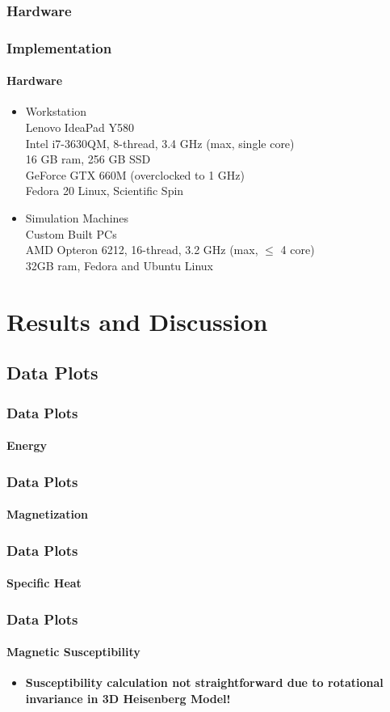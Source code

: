 \documentclass{beamer}
\begin{document}
  \subsubsection*{Hardware}
  \begin{frame}
    \frametitle{Implementation}
    \framesubtitle{Hardware}
    \begin{itemize}
    	\item Workstation\\
    				Lenovo IdeaPad Y580 \\
    				Intel i7-3630QM,  8-thread, 3.4 GHz (max, single core) \\
    				16 GB ram, 256 GB SSD \\
    				GeForce GTX 660M (overclocked to 1 GHz) \\
    				Fedora 20 Linux, Scientific Spin
    	\item Simulation Machines\\
    				Custom Built PCs \\
    				AMD Opteron 6212, 16-thread, 3.2 GHz (max, $\le$ 4 core) \\
    				32GB ram, Fedora and Ubuntu Linux
    \end{itemize}
  \end{frame}
    
  \section{Results and Discussion}
  \subsection{Data Plots}
  \begin{frame}
    \frametitle{Data Plots}
    \framesubtitle{Energy}
  \end{frame}
  \begin{frame}
  	\frametitle{Data Plots}
    \framesubtitle{Magnetization}
  \end{frame}
  \begin{frame}
  	\frametitle{Data Plots}
    \framesubtitle{Specific Heat}
  \end{frame}
  \begin{frame}
  	\frametitle{Data Plots}
    \framesubtitle{Magnetic Susceptibility}
    \begin{itemize}
    	\item \textbf{Susceptibility calculation not straightforward due to rotational invariance in 3D Heisenberg Model!}
    \end{itemize}
  \end{frame}
  
\end{document}
